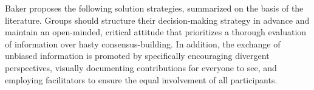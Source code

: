 Baker proposes the following solution strategies, summarized on the basis of the literature. Groups should
structure their decision-making strategy in advance and maintain an open-minded, critical attitude that
prioritizes a thorough evaluation of information over hasty consensus-building. In addition, the exchange of unbiased
information is promoted by specifically encouraging divergent perspectives, visually documenting
contributions for everyone to see, and employing facilitators to ensure the equal involvement of all participants.
\cite[p. 262f.]{bakerEnhancingGroupDecision2010}
